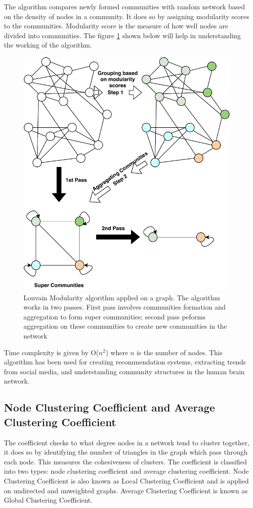 \documentclass[journal,twoside,web]{ieeecolor}
\begin{document}
The algorithm compares newly formed communities with random network based on the density of nodes in a community. It does so by assigning modularity scores to the communities. Modularity score is the measure of how well nodes are divided into communities. The figure \ref{fig7} shown below will help in understanding the working of the algorithm.

\begin{figure}[!h]
    \centerline{\includegraphics[scale=0.7]{figures/louvain.pdf}}
    \caption{Louvain Modularity algorithm applied on a graph. The algorithm works in two passes. First pass involves communities formation and aggregation to form super communities; second pass peforms aggregation on these communities to create new communities in the network}
    \label{fig7}
\end{figure}

Time complexity is given by O($n^2$) where $n$ is the number of nodes. This algorithm has been used for creating recommendation systems\cite{55}, extracting trends from social media\cite{56}, and understanding community structures in the human brain network\cite{57}.

\subsection{Node Clustering Coefficient and Average Clustering Coefficient}
The coefficient checks to what degree nodes in a network tend to cluster together, it does so by identifying the number of triangles in the graph which pass through each node. This measures the cohesiveness of clusters. The coefficient is classified into two types: node clustering coefficient and average clustering coefficient. Node Clustering Coefficient is also known as Local Clustering Coefficient and is applied on undirected and unweighted graphs. Average Clustering Coefficient is known as Global Clustering Coefficient.
\end{document}
